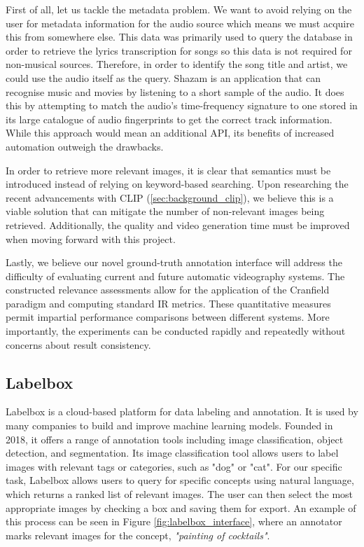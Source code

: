 \documentclass{l4proj}
\begin{document}
First of all, let us tackle the metadata problem. We want to avoid relying on the user for metadata information for the audio source which means we must acquire this from somewhere else. This data was primarily used to query the \cite{genius} database in order to retrieve the lyrics transcription for songs so this data is not required for non-musical sources. Therefore, in order to identify the song title and artist, we could use the audio itself as the query. Shazam \citep{wang2006shazam} is an application that can recognise music and movies by listening to a short sample of the audio. It does this by attempting to match the audio's time-frequency signature to one stored in its large catalogue of audio fingerprints to get the correct track information. While this approach would mean an additional API, its benefits of increased automation outweigh the drawbacks.

In order to retrieve more relevant images, it is clear that semantics must be introduced instead of relying on keyword-based searching. Upon researching the recent advancements with CLIP (\ref{sec:background_clip}), we believe this is a viable solution that can mitigate the number of non-relevant images being retrieved. Additionally, the quality and video generation time must be improved when moving forward with this project.

Lastly, we believe our novel ground-truth annotation interface will address the difficulty of evaluating current and future automatic videography systems. The constructed relevance assessments allow for the application of the Cranfield paradigm and computing standard IR metrics. These quantitative measures permit impartial performance comparisons between different systems. More importantly, the experiments can be conducted rapidly and repeatedly without concerns about result consistency.

\subsection{Labelbox}
\label{sec:labelbox}
Labelbox is a cloud-based platform for data labeling and annotation. It is used by many companies to build and improve machine learning models. Founded in 2018, it offers a range of annotation tools including image classification, object detection, and segmentation. Its image classification tool allows users to label images with relevant tags or categories, such as "dog" or "cat". For our specific task, Labelbox allows users to query for specific concepts using natural language, which returns a ranked list of relevant images. The user can then select the most appropriate images by checking a box and saving them for export. An example of this process can be seen in Figure \ref{fig:labelbox_interface}, where an annotator marks relevant images for the concept, \emph{"painting of cocktails"}.
\end{document}
